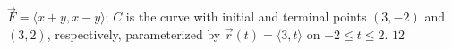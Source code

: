 {$\vec F = \langle x+y,x-y\rangle$; $C$ is the curve with initial and terminal points $(3,-2)$ and $(3,2)$, respectively, parameterized by $\vec r(t) = \langle 3,t\rangle$ on $-2\leq t\leq 2$.
}
{$12$
}
